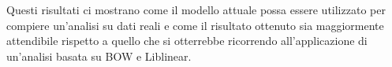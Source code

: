 \documentclass[a4paper,12pt,openright,twoside]{report}
\theoremstyle{definition}
\newtheorem{es}{Esempio}[section]
\begin{document}
Questi risultati ci mostrano come il modello attuale possa essere utilizzato per compiere un'analisi su dati reali e 
come il risultato ottenuto sia maggiormente attendibile rispetto a quello che si 
otterrebbe ricorrendo all'applicazione di un'analisi basata su BOW e Liblinear.

%
\end{document}
